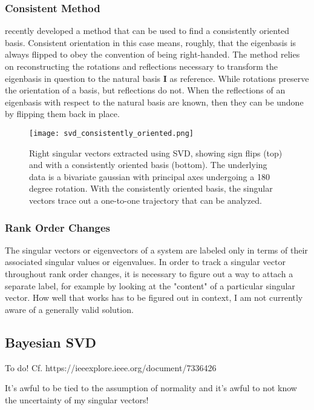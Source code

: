 \subsubsection{Consistent Method}

 recently developed a method that can be used to find a consistently oriented basis. Consistent orientation in this case means, roughly, that the eigenbasis is always flipped to obey the convention of being right-handed. The method relies on reconstructing the rotations and reflections necessary to transform the eigenbasis in question to the natural basis $\mathbf{I}$ as reference. While rotations preserve the orientation of a basis, but reflections do not. When the reflections of an eigenbasis with respect to the natural basis are known, then they can be undone by flipping them back in place. 


\begin{figure}
\centering
    \texttt{[image: svd\_consistently\_oriented.png]}
    \caption{Right singular vectors extracted using SVD, showing sign flips (top) and with a consistently oriented basis (bottom). The underlying data is a bivariate gaussian with principal axes undergoing a 180 degree rotation. With the consistently oriented basis, the singular vectors trace out a one-to-one trajectory that can be analyzed.}
    \label{fig:svd_consistently_oriented}
\end{figure}


\subsubsection{Rank Order Changes}

The singular vectors or eigenvectors of a system are labeled only in terms of their associated singular values or eigenvalues. In order to track a singular vector throughout rank order changes, it is necessary to figure out a way to attach a separate label, for example by looking at the "content" of a particular singular vector. How well that works has to be figured out in context, I am not currently aware of a generally valid solution. 


\subsection{Bayesian SVD}
To do! Cf. https://ieeexplore.ieee.org/document/7336426

It's awful to be tied to the assumption of normality and it's awful to not know the uncertainty of my singular vectors!






